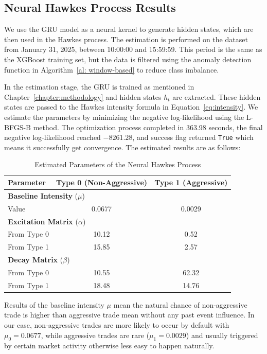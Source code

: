 \subsection{Neural Hawkes Process Results}
We use the GRU model as a neural kernel to generate hidden states, which are then used in the Hawkes process. The estimation is performed on the dataset from January 31, 2025, between 10:00:00 and 15:59:59. This period is the same as the XGBoost training set, but the data is filtered using the anomaly detection function in Algorithm~\ref{al: window-based} to reduce class imbalance.

In the estimation stage, the GRU is trained as mentioned in Chapter~\ref{chapter:methodology} and hidden states \( h_t \) are extracted. These hidden states are passed to the Hawkes intensity formula in Equation~\ref{eq:intensity}. We estimate the parameters by minimizing the negative log-likelihood using the L-BFGS-B method. The optimization process completed in 363.98 seconds, the final negative log-likelihood reached $-8261.28$, and success flag returned \texttt{True} which means it successfully get convergence. The estimated results are as follows:
\begin{table}[H]
    \centering
    \caption{Estimated Parameters of the Neural Hawkes Process}
    \label{tb:hawkes-params}
    \begin{tabular}{lcc}
    \toprule
    \textbf{Parameter} & \textbf{Type 0 (Non-Aggressive)} & \textbf{Type 1 (Aggressive)} \\
    \midrule
    \multicolumn{3}{l}{\textbf{Baseline Intensity} (\( \mu \))} \\
    \quad Value & 0.0677 & 0.0029 \\
    \midrule
    \multicolumn{3}{l}{\textbf{Excitation Matrix} (\( \alpha \))} \\
    \quad From Type 0 & 10.12 & 0.52 \\
    \quad From Type 1 & 15.85 & 2.57 \\
    \midrule
    \multicolumn{3}{l}{\textbf{Decay Matrix} (\( \beta \))} \\
    \quad From Type 0 & 10.55 & 62.32 \\
    \quad From Type 1 & 18.48 & 14.76 \\
    \bottomrule
    \end{tabular}
\end{table}

Results of the baseline intensity $\mu$ mean the natural chance of non-aggressive trade is higher than aggressive trade mean without any past event influence. In our case, non-aggressive trades are more likely to occur by default with $\mu_0 = 0.0677$, while aggressive trades are rare ($\mu_1 = 0.0029$) and usually triggered by certain market activity otherwise less easy to happen naturally.

